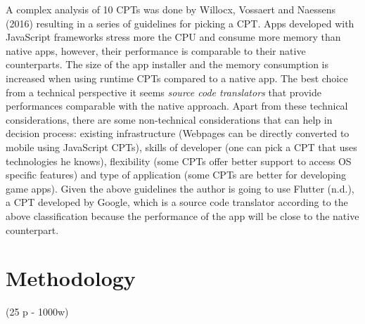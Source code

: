 \documentclass[version=last,fontsize=13pt]{scrartcl}
\begin{document}
	\indent
	A complex analysis of 10  CPTs was done by Willocx, Vossaert and Naessens (2016) resulting in a series of guidelines for picking a CPT. Apps developed with JavaScript frameworks stress more the CPU and consume more memory than native apps, however, their performance is comparable to their native counterparts. The size of the app installer and the memory consumption is increased when using runtime CPTs compared to a native app. The best choice from a technical perspective it seems \textit{source code translators} that provide performances comparable with the native approach. Apart from these technical considerations, there are some non-technical considerations that can help in decision process: existing infrastructure (Webpages can be directly converted to mobile using JavaScript CPTs), skills of developer (one can pick a CPT that uses technologies he knows), flexibility (some CPTs offer better support to access OS specific features) and type of application (some CPTs are better for developing game apps). Given the above guidelines the author is going to use Flutter (n.d.), a CPT developed by Google, which is a source code translator according to the above classification because the performance of the app will be close to the native counterpart.

\section{Methodology}(25 p - 1000w)\\


\end{document}
